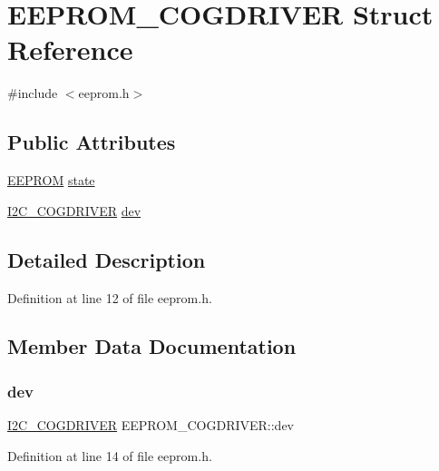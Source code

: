 \hypertarget{structEEPROM__COGDRIVER}{}\section{E\+E\+P\+R\+O\+M\+\_\+\+C\+O\+G\+D\+R\+I\+V\+ER Struct Reference}
\label{structEEPROM__COGDRIVER}


{\ttfamily \#include $<$eeprom.\+h$>$}

\subsection*{Public Attributes}
\begin{DoxyCompactItemize}
\item 
\mbox{\hyperlink{structEEPROM}{E\+E\+P\+R\+OM}} \mbox{\hyperlink{structEEPROM__COGDRIVER_a09b616273a9e6730702230a128ed33b8}{state}}
\item 
\mbox{\hyperlink{structI2C__COGDRIVER}{I2\+C\+\_\+\+C\+O\+G\+D\+R\+I\+V\+ER}} \mbox{\hyperlink{structEEPROM__COGDRIVER_a5f79f288051e4044c1958188468403bb}{dev}}
\end{DoxyCompactItemize}


\subsection{Detailed Description}


Definition at line 12 of file eeprom.\+h.



\subsection{Member Data Documentation}
\mbox{\label{structEEPROM__COGDRIVER_a5f79f288051e4044c1958188468403bb}} 
\subsubsection{\texorpdfstring{dev}{dev}}
{\footnotesize\ttfamily \mbox{\hyperlink{structI2C__COGDRIVER}{I2\+C\+\_\+\+C\+O\+G\+D\+R\+I\+V\+ER}} E\+E\+P\+R\+O\+M\+\_\+\+C\+O\+G\+D\+R\+I\+V\+E\+R\+::dev}



Definition at line 14 of file eeprom.\+h.

\mbox{\label{structEEPROM__COGDRIVER_a09b616273a9e6730702230a128ed33b8}} 
